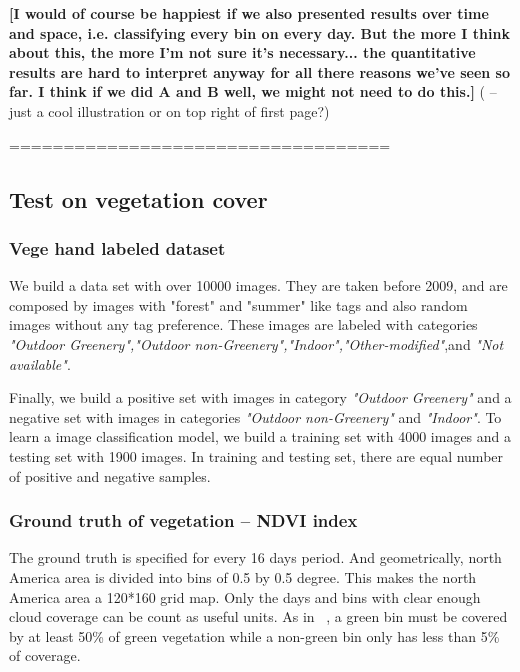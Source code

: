 \textbf{
[I would of course be happiest if we also presented results over time and space, i.e. classifying every bin on every day. But the more I think about this, the more I'm not sure it's necessary... the quantitative results are hard to interpret anyway for all there reasons we've seen so far. I think if we did A and B well, we might not need to do this.]
}( -- just a cool illustration or on top right of first page?)

\hfill \break
\hfill \break
===================================
\hfill \break
\hfill \break

\subsection{Test on vegetation cover}
\subsubsection*{Vege hand labeled dataset}

We build a data set with over 10000 images. They are taken before 2009, and are composed by images with "forest" and "summer" like tags and also random images without any tag preference. These images are labeled with categories 
\textit{"Outdoor Greenery","Outdoor non-Greenery","Indoor","Other-modified"},and \textit{"Not available"}.

Finally, we build a positive set with images in category \textit{"Outdoor Greenery"} and a negative set 
with images in categories \textit{"Outdoor non-Greenery"} and \textit{"Indoor"}. To learn a image classification model, we build a training set with 4000 images and a testing set with 1900 images. In training and testing set, there are equal number of positive and negative samples.

\subsubsection*{Ground truth of vegetation -- NDVI index}
The ground truth is specified for every 16 days period. 
And geometrically, north America area is divided into bins of 0.5 by 0.5 degree. This makes the north America area a 120*160 grid map.
Only the days and bins with clear enough cloud coverage can be count as useful units. As in ~\cite{www paper}, a green bin must be covered by at least 50\% of green vegetation while a non-green bin only has less than 5\% of coverage.


